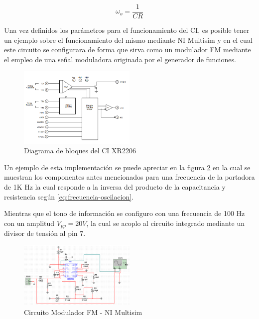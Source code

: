 \documentclass[conference]{IEEEtran}
\begin{document}
	\begin{equation}
		\omega_o = \frac{1}{CR}
		\label{eq:frecuencia-oscilacion}
	\end{equation}
	
	
	Una vez definidos los parámetros para el funcionamiento del CI, es posible tener un ejemplo sobre el funcionamiento del mismo mediante NI Multisim y en el cual este circuito se configurara de forma que sirva como un modulador FM mediante el empleo de una señal moduladora originada por el generador de funciones.
	
	\begin{figure}[h]
		\centering
		\includegraphics[width=0.5\textwidth]{media/diagrama-bloques-xr2206}
		\caption{Diagrama de bloques del CI XR2206}
		\label{fig:diagrama-bloques-xr2206}
	\end{figure}
	
	Un ejemplo de esta implementación se puede apreciar en la figura \ref{fig:simulacion-xr2206} en la cual se muestran los componentes antes mencionados para una frecuencia de la portadora de 1K Hz la cual responde a la inversa del producto de la capacitancia y resistencia según \ref{eq:frecuencia-oscilacion}.
	
	Mientras que el tono de información se configuro con una frecuencia de 100 Hz con un amplitud $V_{pp} = 20V$, la cual se acoplo al circuito integrado mediante un divisor de tensión al pin 7.
	
	
	\begin{figure}[h]
		\centering
		\includegraphics[width=0.5\textwidth]{media/simulacion-xr2206}
		\caption{Circuito Modulador FM - NI Multisim}
		\label{fig:simulacion-xr2206}
	\end{figure}
	
\end{document}
